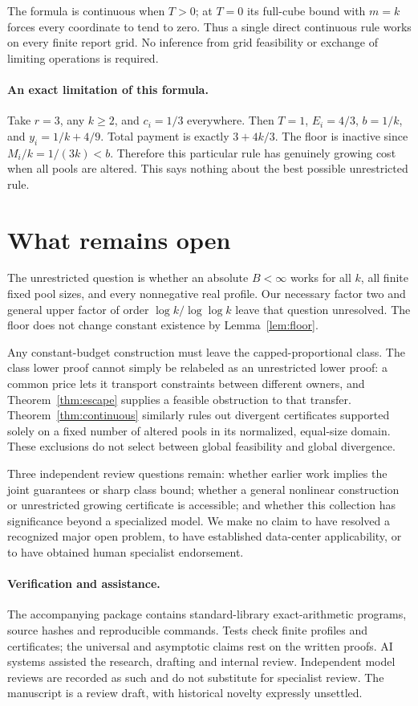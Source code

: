 \documentclass[11pt]{article}
\theoremstyle{definition}\newtheorem{definition}[theorem]{Definition}
\theoremstyle{remark}\newtheorem{remark}[theorem]{Remark}
\begin{document}
The formula is continuous when $T>0$; at $T=0$ its full-cube bound with
$m=k$ forces every coordinate to tend to zero. Thus a single direct
continuous rule works on every finite report grid. No inference from grid
feasibility or exchange of limiting operations is required.

\paragraph{An exact limitation of this formula.}
Take $r=3$, any $k\ge2$, and $c_i=1/3$ everywhere. Then $T=1$, $E_i=4/3$,
$b=1/k$, and $y_i=1/k+4/9$. Total payment is exactly $3+4k/3$.
The floor is inactive since $M_i/k=1/(3k)<b$. Therefore this particular
rule has genuinely growing cost when all pools are altered. This says nothing
about the best possible unrestricted rule.

\section{What remains open}
The unrestricted question is whether an absolute $B<\infty$ works for all
$k$, all finite fixed pool sizes, and every nonnegative real profile. Our
necessary factor two and general upper factor of order $\log k/\log\log k$
leave that question unresolved. The floor does not change constant existence
by Lemma~\ref{lem:floor}.

Any constant-budget construction must leave the capped-proportional class.
The class lower proof cannot simply be relabeled as an unrestricted lower
proof: a common price lets it transport constraints between different owners,
and Theorem~\ref{thm:escape} supplies a feasible obstruction to that transfer.
Theorem~\ref{thm:continuous} similarly rules out divergent certificates
supported solely on a fixed number of altered pools in its normalized,
equal-size domain. These exclusions do not select between global feasibility
and global divergence.

Three independent review questions remain: whether earlier work implies the
joint guarantees or sharp class bound; whether a general nonlinear construction
or unrestricted growing certificate is accessible; and whether this collection
has significance beyond a specialized model. We make no claim to have resolved
a recognized major open problem, to have established data-center applicability,
or to have obtained human specialist endorsement.

\paragraph{Verification and assistance.}
The accompanying package contains standard-library exact-arithmetic programs,
source hashes and reproducible commands. Tests check finite profiles and
certificates; the universal and asymptotic claims rest on the written proofs.
AI systems assisted the research, drafting and internal review. Independent
model reviews are recorded as such and do not substitute for specialist review.
The manuscript is a review draft, with historical novelty expressly unsettled.
\end{document}

